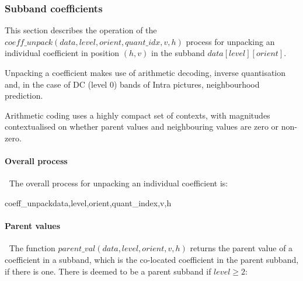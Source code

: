 \subsubsection{Subband coefficients}

\label{wltcoeff}

This section describes the operation of the 
$coeff\_unpack(data,level,orient,quant\_idx,v,h)$ process
for unpacking an individual coefficient in position $(h,v)$ 
in the subband $data[level][orient]$.

Unpacking a coefficient makes use of arithmetic decoding, inverse quantisation
and, in the case of DC (level 0) bands of Intra pictures, neighbourhood prediction.

Arithmetic coding uses a highly compact set of contexts, 
with magnitudes contextualised on whether parent values
and neighbouring values are zero or non-zero.

\paragraph{Overall process}
$\ $\newline
The overall process for unpacking an individual coefficient is:

\begin{pseudo}{coeff\_unpack}{data,level,orient,quant\_index,v,h}
\bsELSE
\bsEND
{}

\end{pseudo}

\paragraph{Parent values}
\label{parentval}
$\ $\newline
The function $parent\_val(data,level,orient,v, h)$ returns the parent value of a coefficient in a subband,
which is the co-located coefficient in the parent subband, if there is one. There is deemed to be a 
parent subband if $level\geq 2$:

